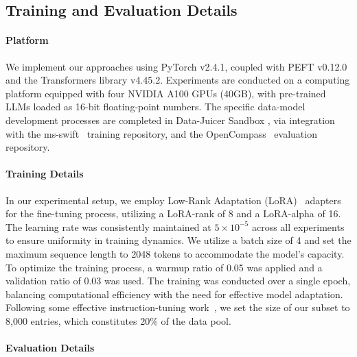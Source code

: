 \subsection{Training and Evaluation Details}\label{sec:appendix-implementation}

\paragraph{Platform} We implement our approaches using PyTorch \cite{paszke2019pytorch} v2.4.1, coupled with PEFT v0.12.0 and the Transformers library \cite{wolf2020transformers} v4.45.2. Experiments are conducted on a computing platform equipped with four NVIDIA A100 GPUs (40GB), with pre-trained LLMs loaded as 16-bit floating-point numbers. 
The specific data-model development processes are completed in Data-Juicer Sandbox \cite{djsandbox}, via integration with the ms-swift~\cite{ms-swift} training repository, and the OpenCompass~\cite{opencompass} evaluation repository. 

\paragraph{Training Details} 

In our experimental setup, we employ Low-Rank Adaptation (LoRA)~\cite{hu2021lora} adapters for the fine-tuning process, utilizing a LoRA-rank of 8 and a LoRA-alpha of 16. The learning rate was consistently maintained at $5 \times 10^{-5}$ across all experiments to ensure uniformity in training dynamics. We utilize a batch size of 4 and set the maximum sequence length to 2048 tokens to accommodate the model's capacity. To optimize the training process, a warmup ratio of 0.05 was applied and a validation ratio of 0.03 was used. The training was conducted over a single epoch, balancing computational efficiency with the need for effective model adaptation. Following some effective instruction-tuning work~\cite{zhou2024lima, lu2023instag}, we set the size of our subset to 8,000 entries, which constitutes 20\% of the data pool.

\paragraph{Evaluation Details} 

